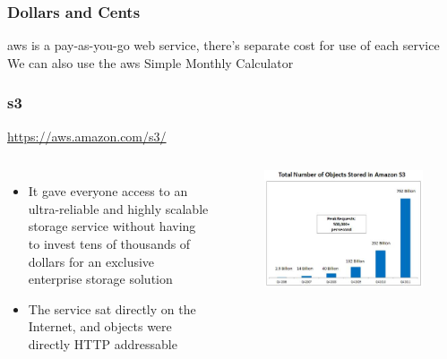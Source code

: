 \documentclass{beamer}
\begin{document}
\begin{frame}
\frametitle{Dollars and Cents}
\gls{aws} is a pay-as-you-go web service, there's separate cost for use of each service
We can also use the \gls{aws} Simple Monthly Calculator
\end{frame}
\begin{frame}
\frametitle[\gls{s3}]{\acrfull{s3}}
\url{https://aws.amazon.com/s3/}
\begin{columns}
  \begin{itemize}
  \item It gave everyone access to an ultra-reliable and highly scalable storage service without having to invest tens of thousands of dollars for an exclusive enterprise storage solution
  \item The service sat directly on the Internet, and objects were directly HTTP addressable
  \end{itemize}
  \begin{figure}
	\includegraphics[width= 1.0 \textwidth]{aws-s3-growth.eps}
  \end{figure}
\end{columns}
\end{frame}
\end{document}
